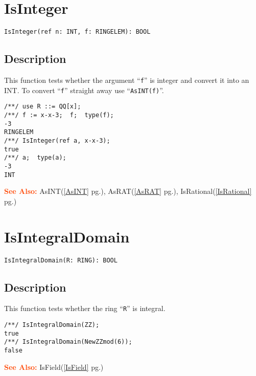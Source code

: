 \documentclass[a4paper]{mybook}
\newenvironment{command}{}{} %
\newcommand\SeeAlso{\par\textcolor{OrangeRed}{\textbf{\large See Also: }}}
\begin{document}
\section{IsInteger}
\label{IsInteger}
\begin{command} %


\begin{Verbatim}[label=syntax, rulecolor=\color{MidnightBlue},
frame=single]
IsInteger(ref n: INT, f: RINGELEM): BOOL
\end{Verbatim}


\subsection*{Description}

This function tests whether the argument ``\verb&f&'' is integer and
convert it into an INT.
To convert ``\verb&f&'' straight away use ``\verb&AsINT(f)&''.
\begin{Verbatim}[label=example, rulecolor=\color{PineGreen}, frame=single]
/**/ use R ::= QQ[x];
/**/ f := x-x-3;  f;  type(f);
-3
RINGELEM
/**/ IsInteger(ref a, x-x-3);
true
/**/ a;  type(a);
-3
INT
\end{Verbatim}


\SeeAlso %
  AsINT(\ref{AsINT} pg.\pageref{AsINT}), 
    AsRAT(\ref{AsRAT} pg.\pageref{AsRAT}), 
    IsRational(\ref{IsRational} pg.\pageref{IsRational})
\end{command} %

\section{IsIntegralDomain}
\label{IsIntegralDomain}
\begin{command} %


\begin{Verbatim}[label=syntax, rulecolor=\color{MidnightBlue},
frame=single]
IsIntegralDomain(R: RING): BOOL
\end{Verbatim}


\subsection*{Description}

This function tests whether the ring ``\verb&R&'' is integral.
\begin{Verbatim}[label=example, rulecolor=\color{PineGreen}, frame=single]
/**/ IsIntegralDomain(ZZ);
true
/**/ IsIntegralDomain(NewZZmod(6));
false
\end{Verbatim}


\SeeAlso %
  IsField(\ref{IsField} pg.\pageref{IsField})
\end{command} %
\end{document}
